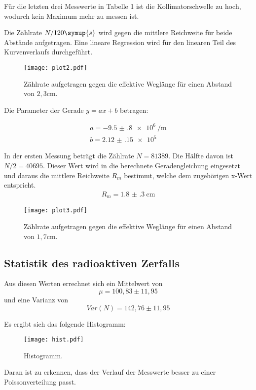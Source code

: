 Für die letzten drei Messwerte in Tabelle 1 ist die Kollimatorschwelle zu hoch, wodurch kein Maximum mehr zu messen ist.

Die Zählrate $N/120\symup{s}$ wird gegen die mittlere Reichweite für beide Abstände aufgetragen. Eine lineare Regression wird für den linearen Teil
des Kurvenverlaufs durchgeführt.

\begin{figure}[H]
  \centering
  \texttt{[image: plot2.pdf]}
  \caption{Zählrate aufgetragen gegen die effektive Weglänge für einen Abstand von $2,3$cm.}
  \label{fig:plot}
\end{figure}


Die Parameter der Gerade $y=ax + b$ betragen:

\begin{align*}
  a = \SI{-9.5(8)e6}{\per\meter} \\
  b = \SI{2.12(15)e5}{}
\end{align*}

In der ersten Messung beträgt die Zählrate $N =81389$. Die Hälfte davon ist $N/2 = 40695$. Dieser Wert wird in die berechnete Geradengleichung eingesetzt und
daraus die mittlere Reichweite $R_m$ bestimmt, welche dem zugehörigen x-Wert entspricht.
\begin{align*}
  R_m = \SI{1.8(3)}{\centi\meter}
\end{align*}


\begin{figure}
  \centering
  \texttt{[image: plot3.pdf]}
  \caption{Zählrate aufgetragen gegen die effektive Weglänge für einen Abstand von $1,7$cm.}
  \label{fig:plot}
\end{figure}





\subsection{Statistik des radioaktiven Zerfalls}
Aus diesen Werten errechnet sich ein Mittelwert von
\begin{equation*}
  \mu = 100,83 \pm 11,95
\end{equation*}
und eine Varianz von
\begin{equation*}
  Var(N) = 142,76 \pm 11,95
\end{equation*}

Es ergibt sich das folgende Histogramm:
\begin{figure}[H]
  \centering
  \texttt{[image: hist.pdf]}
  \caption{Histogramm.}
  \label{fig:hist}
\end{figure}

Daran ist zu erkennen, dass der Verlauf der Messwerte besser zu einer Poissonverteilung passt.
